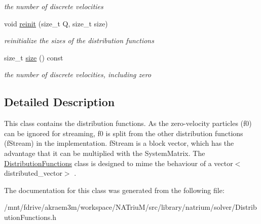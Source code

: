 \begin{DoxyCompactItemize}
\begin{DoxyCompactList}\small\item\em the number of discrete velocities \item\end{DoxyCompactList}\item 
\hypertarget{classnatrium_1_1DistributionFunctions_acaca68f7cbb9322d354ad6dca68b2cb2}{
void \hyperlink{classnatrium_1_1DistributionFunctions_acaca68f7cbb9322d354ad6dca68b2cb2}{reinit} (size\_\-t Q, size\_\-t size)}
\label{classnatrium_1_1DistributionFunctions_acaca68f7cbb9322d354ad6dca68b2cb2}

\begin{DoxyCompactList}\small\item\em reinitialize the sizes of the distribution functions \item\end{DoxyCompactList}\item 
\hypertarget{classnatrium_1_1DistributionFunctions_a636814c639143c76989b09b2a92b6757}{
size\_\-t \hyperlink{classnatrium_1_1DistributionFunctions_a636814c639143c76989b09b2a92b6757}{size} () const }
\label{classnatrium_1_1DistributionFunctions_a636814c639143c76989b09b2a92b6757}

\begin{DoxyCompactList}\small\item\em the number of discrete velocities, including zero \item\end{DoxyCompactList}\end{DoxyCompactItemize}


\subsection{Detailed Description}
This class contains the distribution functions. As the zero-\/velocity particles (f0) can be ignored for streaming, f0 is split from the other distribution functions (fStream) in the implementation. fStream is a block vector, which has the advantage that it can be multiplied with the SystemMatrix. The \hyperlink{classnatrium_1_1DistributionFunctions}{DistributionFunctions} class is designed to mime the behaviour of a vector$<$distributed\_\-vector$>$ . 

The documentation for this class was generated from the following file:\begin{DoxyCompactItemize}
\item 
/mnt/fdrive/akraem3m/workspace/NATriuM/src/library/natrium/solver/DistributionFunctions.h\end{DoxyCompactItemize}

